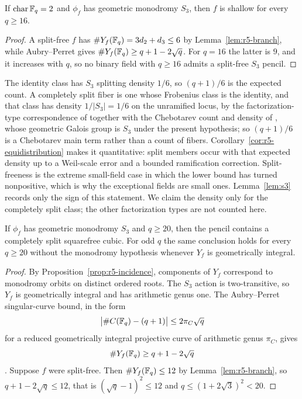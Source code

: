 \begin{corollary}[Binary $S_3$ shallowness above $q=8$]
\label{cor:r5-binary-shallow}%
%
%
%
If $\operatorname{char}\mathbb F_q=2$ and $\phi_f$ has geometric monodromy
$S_3$, then $f$ is shallow for every $q\geq16$.
\end{corollary}

\begin{proof}
A split-free $f$ has $\#Y_f(\mathbb F_q)=3d_2+d_3\leq6$ by
Lemma~\ref{lem:r5-branch}, while Aubry--Perret gives
$\#Y_f(\mathbb F_q)\geq q+1-2\sqrt q$.  For $q=16$ the latter is $9$, and it
increases with $q$, so no binary field with $q\geq16$ admits a split-free
$S_3$ pencil.
\end{proof}

The identity class has $S_3$ splitting density $1/6$, so $(q+1)/6$ is
the expected count.  A completely split fiber is one whose Frobenius
class is the identity, and that class has density $1/|S_3|=1/6$ on the
unramified locus, by the
factorization-type correspondence of \cite[Thm.~3.6]{Wang2026} together
with the Chebotarev count and density of
\cite[Thm.~3.7 and Cor.~3.8]{Wang2026}, whose geometric Galois group is
$S_3$ under the present hypothesis; so
$(q+1)/6$ is a Chebotarev main term rather than a count of fibers.
Corollary~\ref{cor:r5-equidistribution} makes it quantitative: split
members occur with that expected density up to a Weil-scale error and a
bounded ramification correction.  Split-freeness is the extreme
small-field case in which the lower bound has turned nonpositive, which
is why the exceptional fields are small ones.  Lemma~\ref{lem:s3}
records only the sign of this statement.  We claim the density only for
the completely split class; the other factorization types are not
counted here.

\begin{lemma}[$S_3$ stratum]\label{lem:s3}%
%
%
%
If $\phi_f$ has geometric monodromy $S_3$ and $q\geq20$, then the pencil
contains a completely split squarefree cubic.  For odd $q$ the same
conclusion holds for every $q\geq20$ without the monodromy hypothesis
whenever $Y_f$ is geometrically integral.
\end{lemma}

\begin{proof}
By Proposition~\ref{prop:r5-incidence}, components of $Y_f$ correspond
to monodromy orbits on distinct ordered roots.  The $S_3$ action is
two-transitive, so $Y_f$ is geometrically integral and has arithmetic
genus one.  The Aubry--Perret singular-curve bound, in the form
\[
 \bigl|\#C(\mathbb F_q)-(q+1)\bigr|\leq 2\pi_C\sqrt q
\]
for a reduced geometrically integral projective curve of arithmetic
genus \(\pi_C\), gives
\[
       \#Y_f(\mathbb F_q)\geq q+1-2\sqrt q
\]
\cite[p.~468]{AubryPerret1995}.  Suppose $f$ were split-free.  Then
$\#Y_f(\mathbb F_q)\leq12$ by Lemma~\ref{lem:r5-branch}, so
$q+1-2\sqrt q\leq12$, that is $(\sqrt q-1)^2\leq12$ and
$q\leq(1+2\sqrt3)^2<20$.
\end{proof}

